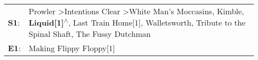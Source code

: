 \begin{supertabular}{p{0.03\textwidth}p{0.92\textwidth}}
 \textbf{S1}:  &  Prowler\textsuperscript{} \textgreater \enspace Intentions Clear\textsuperscript{} \textgreater \enspace White Man's Moccasins\textsuperscript{}, \enspace Kimble\textsuperscript{}, \enspace \textbf{Liquid[1]\textsuperscript{$\wedge$}}, \enspace Last Train Home[1]\textsuperscript{}, \enspace Walletsworth\textsuperscript{}, \enspace Tribute to the Spinal Shaft\textsuperscript{}, \enspace The Fussy Dutchman\textsuperscript{}  \enspace  \\
 \textbf{E1}:  &                                                                                                                                                                                                                                                                                                                                                                                                  Making Flippy Floppy[1]\textsuperscript{}  \enspace  \\
\end{supertabular}
